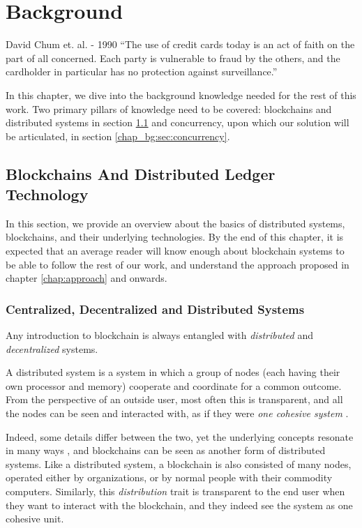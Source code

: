 \chapter{Background} \label{chap:background}

\begin{chapquote}{David Chum et. al. - 1990}
``The use of credit cards today is an act of faith on the part of all concerned. Each party is
vulnerable to fraud by the others, and the cardholder in particular has no protection against
surveillance.''
\end{chapquote}


In this chapter, we dive into the background knowledge needed for the rest of this work. Two primary
pillars of knowledge need to be covered: blockchains and distributed systems in section
\ref{chap_bg:sec:blockchains} and concurrency, upon which our solution will be articulated, in
section \ref{chap_bg:sec:concurrency}.

\section{Blockchains And Distributed Ledger Technology} \label{chap_bg:sec:blockchains}

In this section, we provide an overview about the basics of distributed systems, blockchains, and
their underlying technologies. By the end of this chapter, it is expected that an average reader
will know enough about blockchain systems to be able to follow the rest of our work, and understand the approach proposed in chapter \ref{chap:approach} and onwards.

\subsection{Centralized, Decentralized and Distributed Systems}

Any introduction to blockchain is always entangled with \textit{distributed} and
\textit{decentralized} systems.

A distributed system is a system in which a group of nodes (each having their own processor and
memory) cooperate and coordinate for a common outcome. From the perspective of an outside user, most
often this is transparent, and all the nodes can be seen and interacted with, as if they were
\textit{one cohesive system} \cite{bashirMASTERINGBLOCKCHAINDistributed2018}.

Indeed, some details differ between the two, yet the underlying concepts resonate in many ways
\cite{herlihyBlockchainsDistributedComputing2019}, and blockchains can be seen as another form of
distributed systems. Like a distributed system, a blockchain is also consisted of many nodes,
operated either by organizations, or by normal people with their commodity computers. Similarly,
this \textit{distribution} trait is transparent to the end user when they want to interact with the
blockchain, and they indeed see the system as one cohesive unit.

